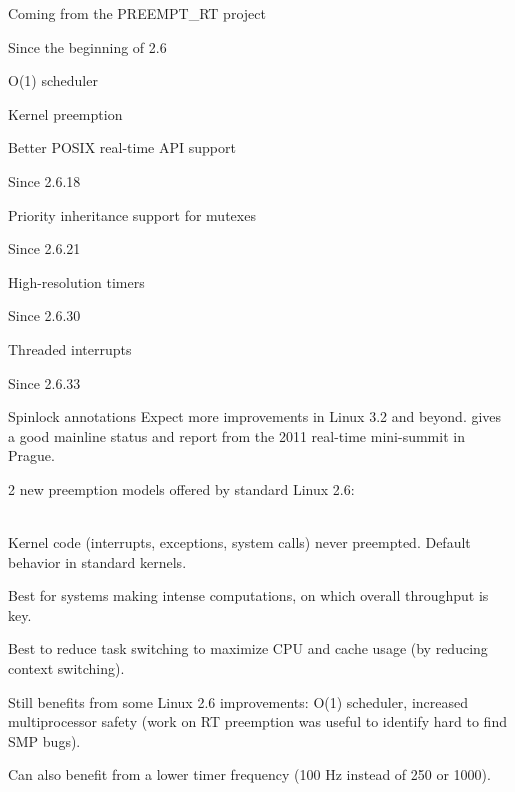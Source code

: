     \startitemize
    \item Coming from the PREEMPT\_RT project
    \item Since the beginning of 2.6
      \startitemize
      \item O(1) scheduler
      \item Kernel preemption
      \item Better POSIX real-time API support
      \stopitemize
    \item Since 2.6.18
      \startitemize
      \item Priority inheritance support for mutexes
      \stopitemize
    \stopitemize
    \startitemize
    \item Since 2.6.21
      \startitemize
      \item High-resolution timers
      \stopitemize
    \stopitemize
    \startitemize
    \item Since 2.6.30
      \startitemize
      \item Threaded interrupts
      \stopitemize
    \item Since 2.6.33
      \startitemize
      \item Spinlock annotations
      \stopitemize
    \stopitemize
  \vspace{0.5cm}
  Expect more improvements in Linux 3.2 and beyond.
   gives a good mainline status
  and report from the 2011 real-time mini-summit in Prague.

  2 new preemption models offered by standard Linux 2.6:

  \\
  Kernel code (interrupts, exceptions, system calls) never preempted.
  Default behavior in standard kernels.
  \startitemize
  \item Best for systems making intense computations, on which overall
    throughput is key.
  \item Best to reduce task switching to maximize CPU and cache usage
    (by reducing context switching).
  \item Still benefits from some Linux 2.6 improvements: O(1)
    scheduler, increased multiprocessor safety (work on RT preemption
    was useful to identify hard to find SMP bugs).
  \item Can also benefit from a lower timer frequency (100 Hz instead
    of 250 or 1000).
  \stopitemize

